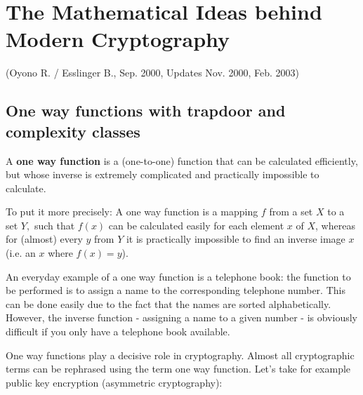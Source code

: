 

\setlength{\fboxrule}{.4pt}
\setlength{\fboxsep}{4pt}

\newpage
\section{The Mathematical Ideas behind Modern Cryptography}
(Oyono R. / Esslinger B., Sep. 2000, Updates Nov. 2000, Feb. 2003)
\subsection{One way functions with trapdoor and complexity classes}
  \hypertarget{OneWayFunktion1}{}
A {\bf one way function} is a (one-to-one) function that can be calculated 
efficiently, but whose inverse is extremely complicated and practically 
impossible to calculate.\par

To put it more precisely:  A one way function is a mapping $ f $ from a set $ X 
$ to a set $ Y, $ such that $ f(x) $ can be calculated easily for each element $ 
x $ of $ X $, whereas for (almost) every $ y $ from $ Y $  it is practically 
impossible to find an inverse image $ x $ (i.e. an $ x $ where $ f(x)=y $).\par

An everyday example of a one way function is a telephone book: the function to 
be performed is to assign a name to the corresponding telephone number. This can 
be done easily due to the fact that the names are sorted alphabetically. 
However, the inverse function - assigning a name to a given number - is 
obviously difficult if you only have a telephone book available. \par

One way functions play a decisive role in cryptography. Almost all cryptographic 
terms can be rephrased using the term one way function. Let's take for example 
public key encryption  
(asymmetric cryptography):\par

